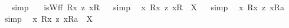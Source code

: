 \begin{isabellebody}
\isadelimproof
\ %
\endisadelimproof
%
\isatagproof
{}\isamarkupfalse%
\ simp\ \isamarkupfalse%
%
\endisatagproof
{\isafoldproof}%
%
\isadelimproof
%
\endisadelimproof
\isanewline
\isanewline
{}\isamarkupfalse%
\ {\isachardoublequoteopen}{\isasymnot}\ isWff\ {\isacharparenleft}{\isacharless}R{}{\isasymbullet}{\isachardot}x{\isachardot}{\isachargreater}\ {\isasymrightarrow}\isactrlsup z\ {\isacharless}{\isachardot}x{\isachardot}{\isasymcirc}R{}{\isachargreater}{\isacharparenright}{\isachardoublequoteclose}%
\isadelimproof
\ %
\endisadelimproof
%
\isatagproof
{}\isamarkupfalse%
\ simp\ \isamarkupfalse%
%
\endisatagproof
{\isafoldproof}%
%
\isadelimproof
%
\endisadelimproof
\isanewline
{}\isamarkupfalse%
\ {\isachardoublequoteopen}{\isasymlambda}x{\isachardot}\ {\isacharless}R{}{\isasymbullet}{\isachardot}x{\isachardot}{\isachargreater}\ {\isasymrightarrow}\isactrlsup z\ {\isacharless}{\isachardot}x{\isachardot}{\isasymcirc}R{}{\isachargreater}{\isacharparenright}\ {\isacharequal}\ X{\isachardoublequoteclose}%
\isadelimproof
\ %
\endisadelimproof
%
\isatagproof
{}\isamarkupfalse%
\ simp\ \isamarkupfalse%
%
\endisatagproof
{\isafoldproof}%
%
\isadelimproof
%
\endisadelimproof
\isanewline
\isanewline
{}\isamarkupfalse%
\ {\isachardoublequoteopen}{\isacharbrackleft}{\isacharless}{\isasymlambda}x{\isachardot}\ {\isacharless}R{}{\isasymbullet}{\isachardot}x{\isachardot}{\isachargreater}\ {\isasymrightarrow}\isactrlsup z\ {\isacharless}{\isachardot}x{\isachardot}{\isasymcirc}R{}{\isachargreater}{\isacharparenright}{\isasymbullet}a{\isachargreater}{\isacharbrackright}{\isachardoublequoteclose}%
\isadelimproof
\ %
\endisadelimproof
%
\isatagproof
{}\isamarkupfalse%
\ simp\ \isamarkupfalse%
%
\endisatagproof
{\isafoldproof}%
%
\isadelimproof
%
\endisadelimproof
\isanewline
{}\isamarkupfalse%
\ {\isachardoublequoteopen}{\isacharless}{\isasymlambda}x{\isachardot}\ {\isacharless}R{}{\isasymbullet}{\isachardot}x{\isachardot}{\isachargreater}\ {\isasymrightarrow}\isactrlsup z\ {\isacharless}{\isachardot}x{\isachardot}{\isasymcirc}R{}{\isachargreater}{\isacharparenright}{\isasymbullet}a{\isachargreater}\ {\isacharequal}\ X{\isachardoublequoteclose}%

\end{isabellebody}
